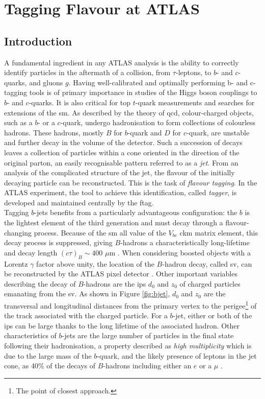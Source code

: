\chapter{Tagging Flavour at ATLAS}
\section{Introduction}
A fundamental ingredient in any ATLAS analysis is the ability to correctly identify particles in the aftermath of a collision, from $\tau$-leptons, to $b$- and $c$-quarks, and gluons $g$. Having well-calibrated and optimally performing b- and c-tagging tools is of primary importance in studies of the Higgs boson couplings to $b$- and $c$-quarks. It is also critical for top $t$-quark measurements and searches for extensions of the \gls{sm}. As described by the theory of \gls{qcd}, colour-charged objects, such as a $b$- or a $c$-quark, undergo hadronisation to form collections of colourless hadrons. These hadrons, mostly $B$ for $b$-quark and $D$ for $c$-quark, are unstable and further decay in the volume of the detector. Such a succession of decays leaves a collection of particles within a cone oriented in the direction of the original parton, an easily recognisable pattern referred to as a \textit{jet}. From an analysis of the complicated structure of the jet, the flavour of the initially decaying particle can be reconstructed. This is the task of \textit{flavour tagging}. In the ATLAS experiment, the tool to achieve this identification, called \textit{tagger}, is developed and maintained centrally by the \gls{ftag}. \\

Tagging $b$-jets benefits from a particularly advantageous configuration:  the $b$ is the lightest element of the third generation and must decay through a flavour-changing process. Because of the \gls{sm} all value of the $V_{bc}$ \gls{ckm} matrix element, this decay process is suppressed, giving $B$-hadrons a characteristically long-lifetime and decay length $(c\tau)_{B} \sim 400$  $\mu$m \cite{Tanabashi:2018oca}. When considering boosted objects with a Lorentz $\gamma$ factor above unity, the location of the $B$-hadron decay, called  \gls{sv}, can be reconstructed by the ATLAS pixel detector \cite{Aad:2019aic}. Other important variables describing the decay of $B$-hadrons are the \glspl{ip} $d_0$ and $z_0$ of charged particles emanating from the \gls{sv}. As shown in Figure \ref{fig:bjet}, $d_0$ and $z_0$ are the transversal and longitudinal distances from the primary vertex to the perigee\footnote{The point of closest approach.} of the track associated with the charged particle. For a $b$-jet, either or both of the \glspl{ip} can be large thanks to the long lifetime of the associated hadron. Other characteristics of $b$-jets are the large number of particles in the final state following their hadronisation, a property described as \textit{high multiplicity} which is due to the large mass of the $b$-quark, and the likely presence of leptons in the jet cone, as 40\% of the decays of $B$-hadrons including either an $e$ or a $\mu$ \cite{Tanabashi:2018oca}. \\

